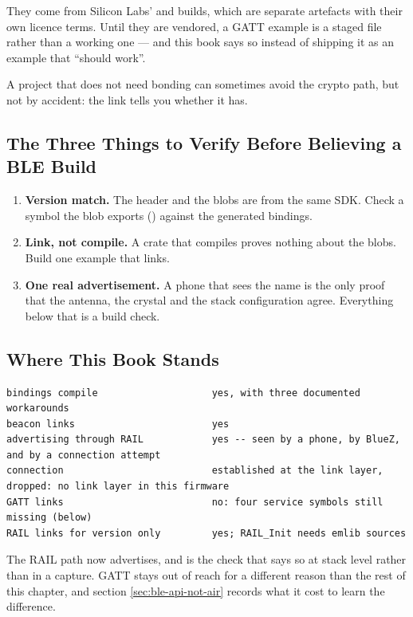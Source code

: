 They come from Silicon Labs'  and  builds, which are
separate artefacts with their own licence terms. Until they are vendored, a GATT example is a staged
file rather than a working one — and this book says so instead of shipping it as an example that
``should work''.

A project that does not need bonding can sometimes avoid the crypto path, but not by accident: the
link tells you whether it has.

\subsection{The Three Things to Verify Before Believing a BLE Build}

\begin{enumerate}
    \item \textbf{Version match.} The header and the blobs are from the same SDK. Check a symbol the
          blob exports ()
          against the generated bindings.
    \item \textbf{Link, not compile.} A  crate that compiles proves nothing about
          the blobs. Build one example that links.
    \item \textbf{One real advertisement.} A phone that sees the name is the only proof that the
          antenna, the crystal and the stack configuration agree. Everything below that is a build
          check.
\end{enumerate}

\subsection{Where This Book Stands}

\begin{verbatim}
bindings compile                    yes, with three documented workarounds
beacon links                        yes
advertising through RAIL            yes -- seen by a phone, by BlueZ, and by a connection attempt
connection                          established at the link layer, dropped: no link layer in this firmware
GATT links                          no: four service symbols still missing (below)
RAIL links for version only         yes; RAIL_Init needs emlib sources
\end{verbatim}

The RAIL path now advertises, and  is the check that says so at
stack level rather than in a capture. GATT stays out of reach for a different reason than the rest of
this chapter, and section \ref{sec:ble-api-not-air} records what it cost to learn the difference.

